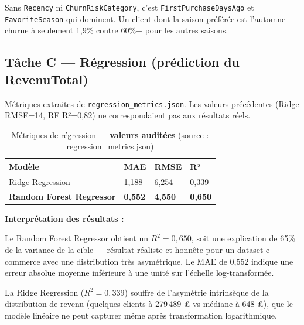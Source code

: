 \documentclass[11pt,a4paper]{article}
\begin{document}
Sans \texttt{Recency} ni \texttt{ChurnRiskCategory}, c'est \texttt{FirstPurchaseDaysAgo} et \texttt{FavoriteSeason} qui dominent. Un client dont la saison préférée est l'automne churne à seulement 1,9\% contre 60\%+ pour les autres saisons.

\subsection{Tâche C — Régression (prédiction du RevenuTotal)}

\begin{tcolorbox}[title=Audit métriques — source : reports/evaluation/regression\_metrics.json, colframe=warningred, colback=lightred, colbacktitle=warningred]
Métriques extraites de \texttt{regression\_metrics.json}. Les valeurs précédentes (Ridge RMSE=14, RF R²=0,82) ne correspondaient pas aux résultats réels.
\end{tcolorbox}

\begin{table}[H]
\centering\small
\caption{Métriques de régression — \textbf{valeurs auditées} (source : regression\_metrics.json)}
\begin{tabular}{L{4.5cm} C{3cm} C{3cm} C{3cm}}
\toprule
{}
\textbf{Modèle} & \textbf{MAE} & \textbf{RMSE} & \textbf{R²} \\
\midrule
Ridge Regression & 1,188 & 6,254 & 0,339 \\
\textbf{Random Forest Regressor} & \textbf{0,552} & \textbf{4,550} & \textbf{0,650} \\
\bottomrule
\end{tabular}
\end{table}

\textbf{Interprétation des résultats :}

Le Random Forest Regressor obtient un $R^2 = 0{,}650$, soit une explication de 65\% de la variance de la cible — résultat réaliste et honnête pour un dataset e-commerce avec une distribution très asymétrique. Le MAE de 0,552 indique une erreur absolue moyenne inférieure à une unité sur l'échelle log-transformée.

La Ridge Regression ($R^2 = 0{,}339$) souffre de l'asymétrie intrinsèque de la distribution de revenu (quelques clients à 279\,489 £ vs médiane à 648 £), que le modèle linéaire ne peut capturer même après transformation logarithmique.
\end{document}
